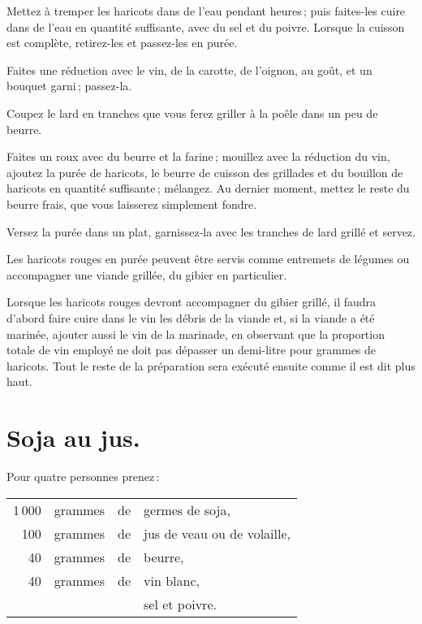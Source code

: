 Mettez à tremper les haricots dans de l’eau pendant {\mmm} heures ; puis
faites-les cuire dans de l’eau en quantité suffisante, avec du sel et du
poivre. Lorsque la cuisson est complète, retirez-les et passez-les en purée.

Faites une réduction avec le vin, de la carotte, de l'oignon, au goût, et un
bouquet garni ; passez-la.

Coupez le lard en tranches que vous ferez griller à la poêle dans un peu de
beurre.

Faites un roux avec du beurre et la farine ; mouillez avec la réduction du vin,
ajoutez la purée de haricots, le beurre de cuisson des grillades et du bouillon
de haricots en quantité suffisante ; mélangez. Au dernier moment, mettez le
reste du beurre frais, que vous laisserez simplement fondre.

Versez la purée dans un plat, garnissez-la avec les tranches de lard grillé et
servez.

Les haricots rouges en purée peuvent être servis comme entremets de légumes
ou accompagner une viande grillée, du gibier en particulier.

Lorsque les haricots rouges devront accompagner du gibier grillé, il faudra
d'abord faire cuire dans le vin les débris de la viande et, si la viande a été
marinée, ajouter aussi le vin de la marinade, en observant que la proportion
totale de vin employé ne doit pas dépasser un demi-litre pour {\mmm}
grammes de haricots. Tout le reste de la préparation sera exécuté ensuite comme
il est dit plus haut.

\section*{\centering Soja au jus.}
{}

Pour quatre personnes prenez :

\footnotesize
\begin{longtable}{rrrp{16em}}
  1 000 & grammes & de & germes de soja,                                                                  \\
    100 & grammes & de & jus de veau ou de volaille,                                                      \\
     40 & grammes & de & beurre,                                                                          \\
     40 & grammes & de & vin blanc,                                                                       \\
        &         &    & sel et poivre.                                                                   \\
\end{longtable}
\normalsize

